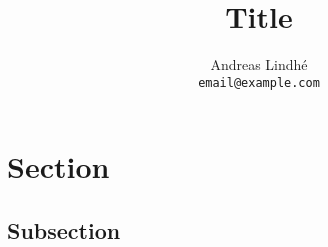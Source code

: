 \documentclass[a4paper]{article}
\title{Title}
\author{Andreas Lindhé\\
    \texttt{email@example.com}}
\begin{document}
\maketitle

\tableofcontents
\newpage

\abstract

\lipsum[1]

\section{Section}

\lipsum[2-3]

\subsection{Subsection}

\lipsum[1]




% 

% 

\end{document}
